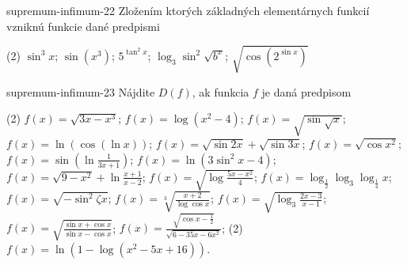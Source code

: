 \begin{defproblem}{supremum-infimum-22}
Zložením ktorých základných elementárnych funkcií vzniknú funkcie dané predpismi
\begin{tasks}(2)
  \task $\sin^3 x$;
  \task $\sin (x^3)$;
  \task $5^{\tan^2 x}$;
  \task $\log_3 \sin^2 \sqrt{b^x}$;
  \task $\sqrt{\cos (2^{\sin x})}$
\end{tasks}
\end{defproblem}

\begin{defproblem}{supremum-infimum-23}
Nájdite $D(f)$, ak funkcia $f$ je daná predpisom
\begin{tasks}(2)
  \task $f(x)=\sqrt{3x-x^3}$;
  \task $f(x)=\log(x^2-4)$;
  \task $f(x)=\sqrt{\sin \sqrt{x}}$;
  \task $f(x)=\ln{(\cos (\ln x))}$;
  \task $f(x)=\sqrt{\sin 2x}+\sqrt{\sin 3x}$;
  \task $f(x)=\sqrt{\cos x^2}$;
  \task $f(x)=\sin (\ln \frac{1}{3x+1})$;
  \task $f(x)=\ln{(3\sin^2 x -4)}$;
  \task $f(x)=\sqrt{9-x^2}+\ln \frac{x+1}{x-2}$;
  \task $f(x)=\sqrt{\log \frac{5x-x^2}{4}}$;
  \task $f(x)=\log_\frac{1}{2}\log_3 \log_\frac{1}{4} x$;
  \task $f(x)=\sqrt{-\sin^2 \zeta x}$;
  \task $f(x)=\sqrt[3]{\frac{x+2}{\log\cos x}}$;
  \task $f(x)=\sqrt{\log_3 \frac{2x-3}{x-1}}$;
  \task $f(x)=\sqrt{\frac{\sin x +\cos x}{\sin x -\cos x}}$;
  \task $f(x)=\frac{\sqrt{\cos x -\frac{1}{2}}}{\sqrt{6-35x-6x^2}}$;
  \task*(2) $f(x)=\ln{(1-\log (x^2-5x+16))}$.
\end{tasks}
\end{defproblem}

